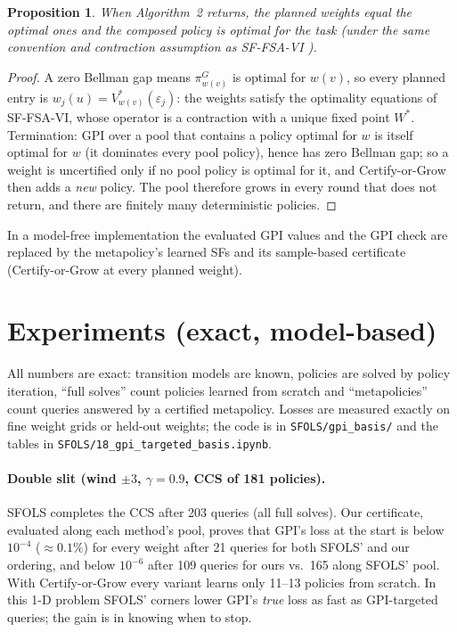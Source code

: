 \documentclass[11pt]{article}
\newtheorem{proposition}{Proposition}
\begin{document}
\begin{proposition}
When Algorithm~2 returns, the planned weights equal the optimal ones and the composed policy is optimal for
the task (under the same convention and contraction assumption as SF-FSA-VI \cite{kuric}).
\end{proposition}
\begin{proof}
A zero Bellman gap means $\pi^G_{w(v)}$ is optimal for $w(v)$, so every planned entry is
$w_j(u)=V^*_{w(v)}(\varepsilon_j)$: the weights satisfy the optimality equations of SF-FSA-VI, whose operator is a
contraction with a unique fixed point $W^*$. Termination: GPI over a pool that contains a policy optimal for
$w$ is itself optimal for $w$ (it dominates every pool policy), hence has zero Bellman gap; so a weight is
uncertified only if no pool policy is optimal for it, and Certify-or-Grow then adds a \emph{new} policy. The
pool therefore grows in every round that does not return, and there are finitely many deterministic policies.
\end{proof}

\noindent In a model-free implementation the evaluated GPI values and the GPI check are replaced by the
metapolicy's learned SFs and its sample-based certificate (Certify-or-Grow at every planned weight).

\section{Experiments (exact, model-based)}
All numbers are exact: transition models are known, policies are solved by policy iteration, ``full
solves'' count policies learned from scratch and ``metapolicies'' count queries answered by a certified
metapolicy. Losses are measured exactly on fine weight grids or held-out weights; the code is in
\texttt{SFOLS/gpi\_basis/} and the tables in \texttt{SFOLS/18\_gpi\_targeted\_basis.ipynb}.

\paragraph{Double slit (wind $\pm3$, $\gamma=0.9$, CCS of 181 policies).}
SFOLS completes the CCS after 203 queries (all full solves). Our certificate, evaluated along each method's
pool, proves that GPI's loss at the start is below $10^{-4}$ ($\approx0.1\%$) for every weight after 21 queries
for both SFOLS' and our ordering, and below $10^{-6}$ after 109 queries for ours vs.\ 165 along SFOLS' pool.
With Certify-or-Grow every variant learns only 11--13 policies from scratch. In this 1-D problem SFOLS'
corners lower GPI's \emph{true} loss as fast as GPI-targeted queries; the gain is in knowing when to stop.
\end{document}
